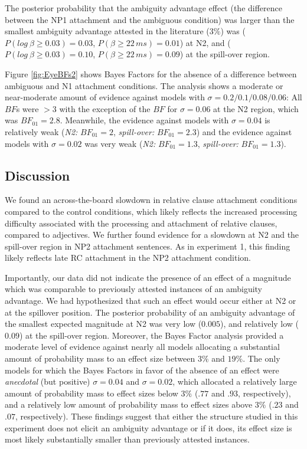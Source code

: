 \documentclass[english, doc]{apa7}\usepackage[]{graphicx}\usepackage[]{color}
\begin{document}
The posterior probability that the ambiguity advantage effect (the difference between the NP1 attachment and the ambiguous condition) was larger than the smallest ambiguity advantage attested in the literature ($3\%$) was
(\(P(log~\beta \geq 0.03 ) = 0.03 \), 
\(P(\beta \geq 22\,ms ) = 
    0.01
  \))
at N2, and
(\(P(log~\beta \geq 0.03 ) = 0.10 \), 
\(P(\beta \geq 22\,ms ) = 
    0.09
  \))
at the spill-over region.

Figure \ref{fig:EyeBFs2} shows Bayes Factors for the absence of a difference between ambiguous and N1 attachment conditions.
The analysis shows a moderate or near-moderate amount of evidence against models with 
$\sigma=0.2/0.1/0.08/0.06$: All $BF$s were $>3$ with the exception of the $BF$ for $\sigma=0.06$ at the N2 region, which was $BF_{01}=2.8$. Meanwhile, the evidence against models with $\sigma=0.04$ is relatively weak (\emph{N2:} $BF_{01} = 2$, \emph{spill-over:}  $BF_{01} = 2.3$) and the evidence against models with $\sigma=0.02$ was very weak
(\emph{N2:} $BF_{01} = 1.3$, \emph{spill-over:}  $BF_{01} = 1.3$).



\subsection{Discussion}

We found an across-the-board slowdown in relative clause attachment conditions compared to the control conditions, which likely reflects the increased processing difficulty associated with the processing and attachment of relative clauses, compared to adjectives. We further found evidence for a slowdown at N2 and the spill-over region in NP2 attachment sentences. As in experiment 1, this finding likely reflects late RC attachment in the NP2 attachment condition. 


Importantly, our data did not indicate the presence of an effect of a magnitude which was comparable to previously attested instances of an ambiguity advantage. We had hypothesized that such an effect would occur either at N2 or at the spillover position. The posterior probability of an ambiguity advantage of the smallest expected magnitude at N2 was very low
($0.005$), and relatively low ($0.09$) at the spill-over region.
Moreover, the Bayes Factor analysis provided a moderate level of evidence against nearly all models allocating a substantial amount of probability mass to an effect size between $3\%$ and $19\%$. 
%
The only models for which the Bayes Factors in favor of the absence of an effect were \emph{anecdotal} (but positive) $\sigma=0.04$ and $\sigma=0.02$, which allocated a relatively large amount of probability mass to effect sizes below $3\%$ ($.77$ and $.93$, respectively), and a relatively low amount of probability mass to effect sizes above $3\%$  ($.23$ and $.07$, respectively).
These findings suggest that either the structure studied in this experiment does not elicit an ambiguity advantage or if it does, its effect size is most likely substantially smaller than previously attested instances.
\end{document}
